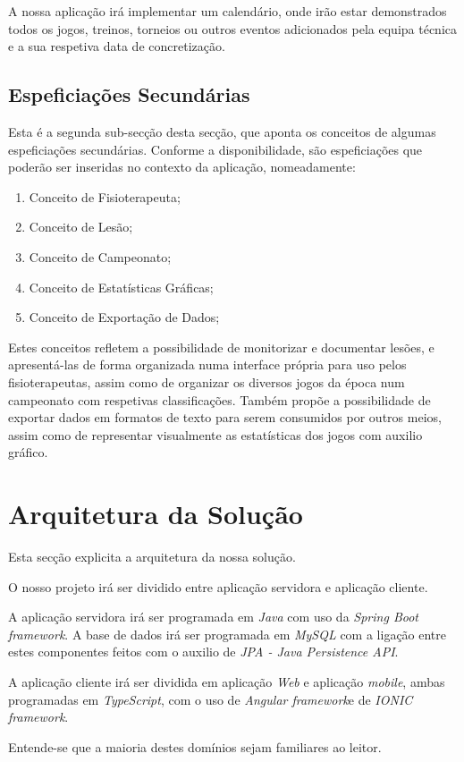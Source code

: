 A nossa aplicação irá implementar um calendário, onde irão estar demonstrados todos os jogos, treinos, torneios ou outros eventos adicionados pela equipa técnica e a sua respetiva data de concretização.



\subsection{Espeficiações Secundárias} \label{sec222}
Esta é a segunda sub-secção desta secção, que aponta os conceitos de algumas espeficiações secundárias. Conforme a disponibilidade, são espeficiações que poderão ser inseridas no contexto da aplicação, nomeadamente:
\begin{enumerate}
	\item Conceito de Fisioterapeuta;
	\item Conceito de Lesão;
	\item Conceito de Campeonato;
	\item Conceito de Estatísticas Gráficas;
	\item Conceito de Exportação de Dados;
\end{enumerate}

Estes conceitos refletem a possibilidade de monitorizar e documentar lesões, e apresentá-las de forma organizada numa interface própria para uso pelos fisioterapeutas, assim como de organizar os diversos jogos da época num campeonato com respetivas classificações. Também propõe a possibilidade de exportar dados em formatos de texto para serem consumidos por outros meios, assim como de representar visualmente as estatísticas dos jogos com auxilio gráfico.

\section{Arquitetura da Solução}\label{sec23}
Esta secção explicita a arquitetura da nossa solução.

O nosso projeto irá ser dividido entre aplicação servidora e aplicação cliente.

A aplicação servidora irá ser programada em \emph{Java} com uso da \emph{Spring Boot framework}. A base de dados irá ser programada em \emph{MySQL} com a ligação entre estes componentes feitos com o auxilio de \emph{JPA - Java Persistence API}.

A aplicação cliente irá ser dividida em aplicação \emph{Web} e aplicação \emph{mobile}, ambas programadas em \emph{TypeScript}, com o uso de \emph{Angular framework}e de \emph{IONIC framework}.

Entende-se que a maioria destes domínios sejam familiares ao leitor.

